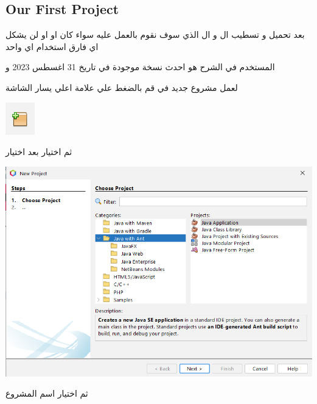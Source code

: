   \subsection{Our First Project}
  \begin{AR}
    بعد تحميل و تسطيب ال  و ال الذي سوف نقوم بالعمل عليه سواء كان  او  او  لن يشكل اي فارق استخدام اي واحد

    المستخدم في الشرح هو  احدث نسخة موجودة في تاريخ 31 اغسطس 2023 و 

    لعمل مشروع جديد في  قم بالضغط علي علامة  اعلي يسار الشاشة
  \end{AR}
  \begin{center}
    \includegraphics[scale=.7]{newProjecticon.png}  
  \end{center}
  \begin{AR}
    ثم اختيار  بعد اختيار 
  \end{AR}
  \begin{center}
    \includegraphics[scale=.5]{Java_app.png}  
  \end{center}
  \newpage
  \begin{AR}
    ثم اختيار اسم المشروع 
  \end{AR}
